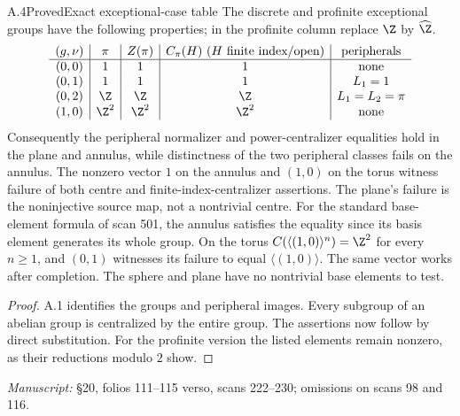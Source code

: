 \begin{claim}{A.4}{Proved}{Exact exceptional-case table}
The discrete and profinite exceptional groups have the following properties; in the profinite column replace $\Z$ by $\widehat\Z$.
\[
\begin{array}{c|c|c|c|c}
(g,\nu)&\pi& Z(\pi)&C_\pi(H)\ (H\text{ finite index/open})&\text{peripherals}\\\hline
(0,0)&1&1&1&\text{none}\\
(0,1)&1&1&1&L_1=1\\
(0,2)&\Z&\Z&\Z&L_1=L_2=\pi\\
(1,0)&\Z^2&\Z^2&\Z^2&\text{none}
\end{array}
\]
Consequently the peripheral normalizer and power-centralizer equalities hold in the plane and annulus, while distinctness of the two peripheral classes fails on the annulus. The nonzero vector $1$ on the annulus and $(1,0)$ on the torus witness failure of both centre and finite-index-centralizer assertions. The plane's failure is the noninjective source map, not a nontrivial centre. For the standard base-element formula of scan 501, the annulus satisfies the equality since its basis element generates its whole group. On the torus $C(\langle(1,0)\rangle^n)=\Z^2$ for every $n\ge1$, and $(0,1)$ witnesses its failure to equal $\langle(1,0)\rangle$. The same vector works after completion. The sphere and plane have no nontrivial base elements to test.
\end{claim}
\begin{proof}
A.1 identifies the groups and peripheral images. Every subgroup of an abelian group is centralized by the entire group. The assertions now follow by direct substitution. For the profinite version the listed elements remain nonzero, as their reductions modulo $2$ show.
\end{proof}
\noindent\emph{Manuscript:} \S20, folios 111--115 verso, scans 222--230; omissions on scans 98 and 116.


